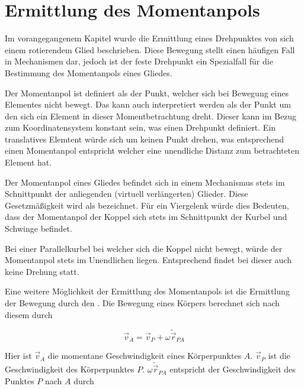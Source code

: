 
\chapter{Ermittlung des Momentanpols}\label{ch:ermittlung_momentanpol}


Im vorangegangenem Kapitel wurde die Ermittlung eines Drehpunktes von sich einem rotierendem Glied beschrieben.
Diese Bewegung stellt einen häufigen Fall in Mechanismen dar, jedoch ist der feste Drehpunkt ein Spezialfall für die Bestimmung des Momentanpols eines Gliedes.

Der Momentanpol ist definiert als der Punkt, welcher sich bei Bewegung eines Elementes nicht bewegt.
Das kann auch interpretiert werden als der Punkt um den sich ein Element in dieser Momentbetrachtung dreht.
Dieser kann im Bezug zum Koordinatensystem konstant sein, was einen Drehpunkt definiert.
Ein translatives Elemtent würde sich um keinen Punkt drehen, was entsprechend einen Momentanpol entspricht welcher eine unendliche Distanz zum betrachteten Element hat.

Der Momentanpol eines Gliedes befindet sich in einem Mechanismus stets im Schnittpunkt der anliegenden (virtuell verlängerten) Glieder.
Diese Gesetzmäßigkeit wird als  %
bezeichnet.
Für ein Viergelenk würde dies Bedeuten, dass der Momentanpol der Koppel sich stets im Schnittpunkt der Kurbel und Schwinge befindet.

Bei einer Parallelkurbel bei welcher sich die Koppel nicht bewegt, würde der Momentanpol stets im Unendlichen liegen.
Entsprechend findet bei dieser auch keine Drehung statt.

Eine weitere Möglichkeit der Ermittlung des Momentanpols ist die Ermittlung der Bewegung durch den . %
Die Bewegung eines Körpers berechnet sich nach diesem durch

\begin{equation}
    \vec{v}_A = \vec{v}_P + \omega \tilde{\vec{r}}_{PA}
    \label{eq:satz_von_euler}
\end{equation} 

Hier ist $\vec{v}_A$ die momentane Geschwindigkeit eines Körperpunktes $A$.
$\vec{v}_P$ ist die Geschwindigkeit des Körperpunktes $P$.
$\omega\tilde{\vec{r}}_{PA}$ entspricht der Geschwindigkeit des Punktes $P$ nach $A$ durch %

